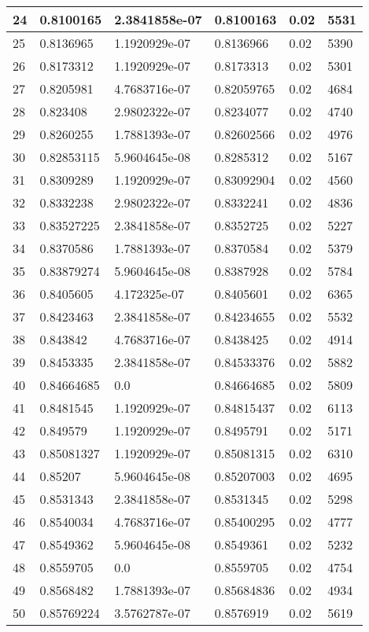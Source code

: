 \begin{longtable}{|l|l|l|l|l|l|}
24 & 0.8100165 & 2.3841858e-07 & 0.8100163 & 0.02 & 5531 \\ \hline 
25 & 0.8136965 & 1.1920929e-07 & 0.8136966 & 0.02 & 5390 \\ \hline 
26 & 0.8173312 & 1.1920929e-07 & 0.8173313 & 0.02 & 5301 \\ \hline 
27 & 0.8205981 & 4.7683716e-07 & 0.82059765 & 0.02 & 4684 \\ \hline 
28 & 0.823408 & 2.9802322e-07 & 0.8234077 & 0.02 & 4740 \\ \hline 
29 & 0.8260255 & 1.7881393e-07 & 0.82602566 & 0.02 & 4976 \\ \hline 
30 & 0.82853115 & 5.9604645e-08 & 0.8285312 & 0.02 & 5167 \\ \hline 
31 & 0.8309289 & 1.1920929e-07 & 0.83092904 & 0.02 & 4560 \\ \hline 
32 & 0.8332238 & 2.9802322e-07 & 0.8332241 & 0.02 & 4836 \\ \hline 
33 & 0.83527225 & 2.3841858e-07 & 0.8352725 & 0.02 & 5227 \\ \hline 
34 & 0.8370586 & 1.7881393e-07 & 0.8370584 & 0.02 & 5379 \\ \hline 
35 & 0.83879274 & 5.9604645e-08 & 0.8387928 & 0.02 & 5784 \\ \hline 
36 & 0.8405605 & 4.172325e-07 & 0.8405601 & 0.02 & 6365 \\ \hline 
37 & 0.8423463 & 2.3841858e-07 & 0.84234655 & 0.02 & 5532 \\ \hline 
38 & 0.843842 & 4.7683716e-07 & 0.8438425 & 0.02 & 4914 \\ \hline 
39 & 0.8453335 & 2.3841858e-07 & 0.84533376 & 0.02 & 5882 \\ \hline 
40 & 0.84664685 & 0.0 & 0.84664685 & 0.02 & 5809 \\ \hline 
41 & 0.8481545 & 1.1920929e-07 & 0.84815437 & 0.02 & 6113 \\ \hline 
42 & 0.849579 & 1.1920929e-07 & 0.8495791 & 0.02 & 5171 \\ \hline 
43 & 0.85081327 & 1.1920929e-07 & 0.85081315 & 0.02 & 6310 \\ \hline 
44 & 0.85207 & 5.9604645e-08 & 0.85207003 & 0.02 & 4695 \\ \hline 
45 & 0.8531343 & 2.3841858e-07 & 0.8531345 & 0.02 & 5298 \\ \hline 
46 & 0.8540034 & 4.7683716e-07 & 0.85400295 & 0.02 & 4777 \\ \hline 
47 & 0.8549362 & 5.9604645e-08 & 0.8549361 & 0.02 & 5232 \\ \hline 
48 & 0.8559705 & 0.0 & 0.8559705 & 0.02 & 4754 \\ \hline 
49 & 0.8568482 & 1.7881393e-07 & 0.85684836 & 0.02 & 4934 \\ \hline 
50 & 0.85769224 & 3.5762787e-07 & 0.8576919 & 0.02 & 5619 \\ \hline 
\end{longtable}